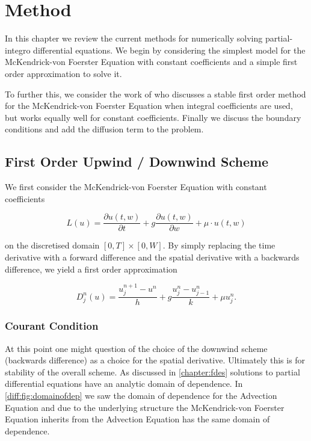 \documentclass[../main.tex]{subfiles}
\begin{document}
  \chapter{Method}\label{chapter:method}

  In this chapter we review the current methods for numerically solving partial-integro differential equations. We begin by considering the simplest model for the McKendrick-von Foerster Equation with constant coefficients and a simple first order approximation to solve it.

  To further this, we consider the work of \cite{hartvig2011} who discusses a stable first order method for the McKendrick-von Foerster Equation when integral coefficients are used, but works equally well for constant coefficients. Finally we discuss the boundary conditions and add the diffusion term to the problem.

  \section{First Order Upwind / Downwind Scheme}
  We first consider the McKendrick-von Foerster Equation with constant coefficients

  \begin{equation}
    L(u) = \frac{\partial u(t, w)}{\partial t} + g \frac{\partial u(t, w)}{\partial w} + \mu \cdot u(t, w)
  \end{equation}

  on the discretised domain $[0, T] \times [0, W]$. By simply replacing the time derivative with a forward difference and the spatial derivative with a backwards difference, we yield a first order approximation

  \begin{equation}
    D^n_j(u) = \frac{u^{n+1}_j - u^n}{h} + g \frac{u^n_{j} - u^n_{j-1}}{k} + \mu u^n_j.
  \end{equation}

  \subsection{Courant Condition} \label{method:sec:courant}
  At this point one might question of the choice of the downwind scheme (backwards difference) as a choice for the spatial derivative. Ultimately this is for stability of the overall scheme. As discussed in \autoref{chapter:fdes} solutions to partial differential equations have an analytic domain of dependence. In \autoref{diff:fig:domainofdep} we saw the domain of dependence for the Advection Equation and due to the underlying structure the McKendrick-von Foerster Equation inherits from the Advection Equation has the same domain of dependence.
\end{document}

